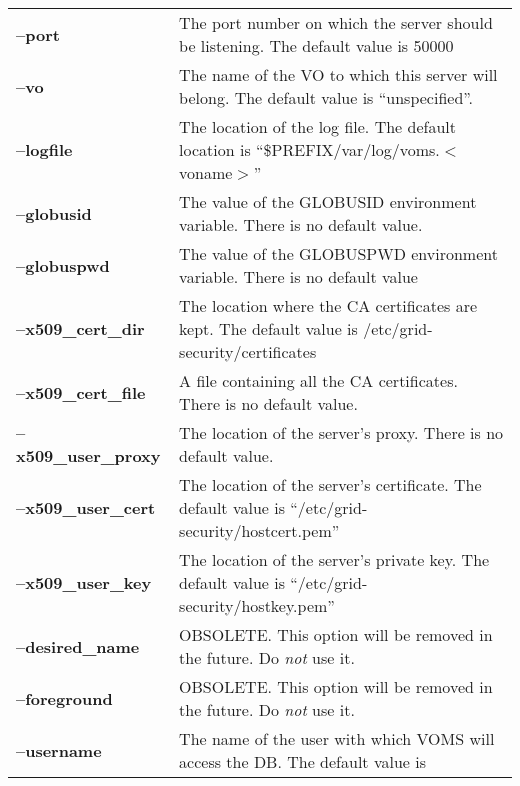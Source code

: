 \documentclass[a4paper]{book}
\begin{document}
\begin{longtable}{lp{2.9in}}
\textbf{--port}            & The port number on which the server
                             should be listening.  The default value
                             is 50000\\
\textbf{--vo}              & The name of the VO to which this server
                             will belong.  The default value is
                             ``unspecified''.\\ 
\textbf{--logfile}         & The location of the log file.  The
                             default location is
                             ``\$PREFIX/var/log/voms.$<$voname$>$''\\
\textbf{--globusid}        & The value of the GLOBUSID environment
                             variable.  There is no default value.\\ 
\textbf{--globuspwd}       & The value of the GLOBUSPWD environment
                             variable.  There is no default value\\ 
\textbf{--x509\_cert\_dir}   & The location where the CA certificates
                             are kept.  The default value is
                             /etc/grid-security/certificates\\ 
\textbf{--x509\_cert\_file}  & A file containing all the CA
                             certificates.  There is no default
                             value.\\ 
\textbf{--x509\_user\_proxy} & The location of the server's proxy.
                             There is no default value.\\
\textbf{--x509\_user\_cert}  & The location of the server's
                             certificate.  The default value is
                             ``/etc/grid-security/hostcert.pem''\\ 
\textbf{--x509\_user\_key}   & The location of the server's private
                             key.  The default value is
                             ``/etc/grid-security/hostkey.pem''\\ 
\textbf{--desired\_name}    & OBSOLETE.  This option will be removed in
                             the future.  Do \emph{not} use it.\\ 
\textbf{--foreground}      & OBSOLETE.  This option will be removed in
                             the future.  Do \emph{not} use it.\\ 
\textbf{--username}        & The name of the user with which VOMS will
                             access the DB.  The default value is

\end{longtable}
\end{document}
